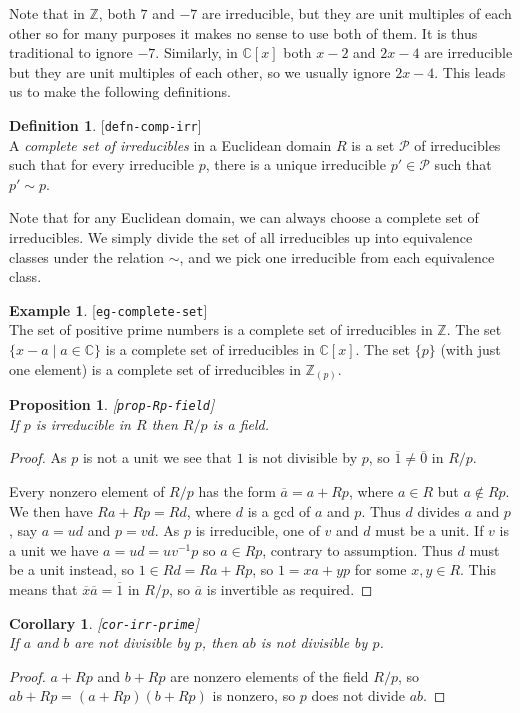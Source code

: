 \documentclass{amsart}
\newcommand{\lbl}[1]{\label{#1}\textup{[\texttt{#1}]}\ \\}
\newcommand{\lbl}{\label}
\newcommand{\C}         {{\mathbb{C}}}
\newcommand{\Z}         {{\mathbb{Z}}}
\newcommand{\Zpl}       {{\mathbb{Z}_{(p)}}}
\newcommand{\ov}[1]     {\overline{#1}}
\newcommand{\st}        {\;|\;}
\newcommand{\CP}        {{\mathcal{P}}}
\renewcommand{\:}{\colon}
\newtheorem{proposition}[theorem]{Proposition}
\newtheorem{corollary}[theorem]{Corollary}
\theoremstyle{definition}
\newtheorem{definition}[theorem]{Definition}
\newtheorem{example}[theorem]{Example}
\begin{document}
Note that in $\Z$, both $7$ and $-7$ are irreducible, but they are
unit multiples of each other so for many purposes it makes no sense to
use both of them.  It is thus traditional to ignore $-7$.  Similarly,
in $\C[x]$ both $x-2$ and $2x-4$ are irreducible but they are unit
multiples of each other, so we usually ignore $2x-4$.  This leads us
to make the following definitions.
\begin{definition}\lbl{defn-comp-irr}
 A \emph{complete set of irreducibles} in a Euclidean domain $R$ is a
 set $\CP$ of irreducibles such that for every irreducible $p$, there
 is a unique irreducible $p'\in\CP$ such that $p'\sim p$.
\end{definition}
Note that for any Euclidean domain, we can always choose a complete
set of irreducibles.  We simply divide the set of all irreducibles up
into equivalence classes under the relation $\sim$, and we pick one
irreducible from each equivalence class.
\begin{example}\lbl{eg-complete-set}
 The set of positive prime numbers is a complete set of irreducibles
 in $\Z$.  The set $\{x-a\st a\in\C\}$ is a complete set of
 irreducibles in $\C[x]$.  The set $\{p\}$ (with just one element) is
 a complete set of irreducibles in $\Zpl$.
\end{example}

\begin{proposition}\lbl{prop-Rp-field}
 If $p$ is irreducible in $R$ then $R/p$ is a field.
\end{proposition}
\begin{proof}
 As $p$ is not a unit we see that $1$ is not divisible by $p$, so
 $\ov{1}\neq\ov{0}$ in $R/p$.

 Every nonzero element of $R/p$ has the form $\ov{a}=a+Rp$, where
 $a\in R$ but $a\not\in Rp$.  We then have $Ra+Rp=Rd$, where $d$ is a
 gcd of $a$ and $p$.  Thus $d$ divides $a$ and $p$, say $a=ud$ and
 $p=vd$.  As $p$ is irreducible, one of $v$ and $d$ must be a unit.
 If $v$ is a unit we have $a=ud=uv^{-1}p$ so $a\in Rp$, contrary to
 assumption.  Thus $d$ must be a unit instead, so $1\in Rd=Ra+Rp$, so
 $1=xa+yp$ for some $x,y\in R$.  This means that $\ov{x}\ov{a}=\ov{1}$
 in $R/p$, so $\ov{a}$ is invertible as required.
\end{proof}
\begin{corollary}\lbl{cor-irr-prime}
 If $a$ and $b$ are not divisible by $p$, then $ab$ is not divisible
 by $p$.
\end{corollary}
\begin{proof}
 $a+Rp$ and $b+Rp$ are nonzero elements of the field $R/p$, so
 $ab+Rp=(a+Rp)(b+Rp)$ is nonzero, so $p$ does not divide $ab$.
\end{proof}
\end{document}

